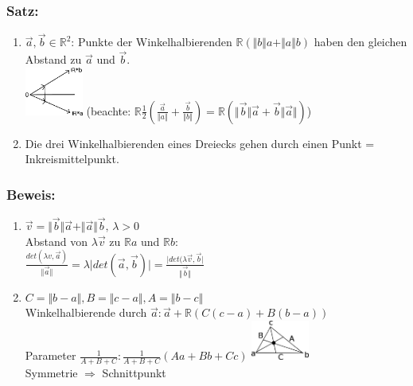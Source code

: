 \subsubsection{Satz:}
\begin{enumerate}
	\item $\vec{a},\vec{b}\in\mathbb{R}^{2}$: Punkte der Winkelhalbierenden  
	$\mathbb{R}(\Vert b\Vert a+\Vert a\Vert b)$ haben den gleichen Abstand zu 
	$\vec{a}$ und $\vec{b}$. \\\includegraphics[width=0.15\textwidth]
	{mainmatter/chapter1/pics/abstd1.png}
	(beachte: $\mathbb{R}\frac{1}{2}(\frac{\vec{a}}{\Vert a\Vert}+\frac{\vec{b}}{\Vert 
	b\Vert})=\mathbb{R}(\Vert \vec{b}\Vert\vec{a}+\vec{b}\Vert\vec{a}\Vert)$)
	\item Die drei Winkelhalbierenden eines Dreiecks gehen durch einen Punkt = 
	Inkreismittelpunkt.
\end{enumerate}
%
%
%
\subsubsection{Beweis:}
\begin{enumerate}
	\item $\vec{v}=\Vert\vec{b}\Vert\vec{a}+\Vert\vec{a}\Vert\vec{b}, \, \lambda >0$\\
	Abstand von $\lambda\vec{v}$ zu $\mathbb{R}a$ und $\mathbb{R}b:$\\
	$\frac{det(\lambda v,\vec{a})}{\Vert\vec{a}\Vert}=\lambda \vert det(\vec{a},
	\vec{b})\vert = \frac{\vert det(\lambda \vec{v},\vec{b}\vert}{\Vert\vec{b}\Vert}$
	

	\item $C = \Vert b-a\Vert, B=\Vert c-a \Vert, A=\Vert b-c \Vert$\\
	Winkelhalbierende durch $\vec{a}: \vec{a}+\mathbb{R}(C(c-a)+B(b-a))$\\
	Parameter $\frac{1}{A+B+C}:\frac{1}{A+B+C}(Aa+Bb+Cc)$\qquad \qquad
	\includegraphics[width=0.15\textwidth]
	{mainmatter/chapter1/pics/abstd2.png}\\
	Symmetrie $\Rightarrow$ Schnittpunkt

\end{enumerate}
%
%
%
